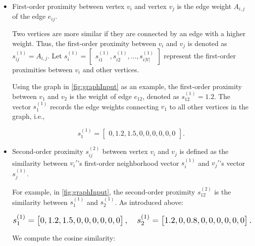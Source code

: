 \begin{itemize}
	\item
	\begin{definition}\label{def:firstOrderProximity}
		First-order proximity between vertex \(v_i\) and vertex \(v_j\) is the edge weight \(A_{i, j}\) of the edge \(e_{ij}\).
	\end{definition}
	
	Two vertices are more similar if they are connected by an edge with a higher weight. Thus, the first-order proximity between \(v_i\) and \(v_j\) is denoted as \(s^{(1)}_{ij} = A_{i, j}\). Let \(s^{(1)}_i = \begin{bmatrix} s^{(1)}_{i1}, s^{(1)}_{i2}, \dots, s^{(1)}_{i|V|} \end{bmatrix}\) represent the first-order proximities between \(v_i\) and other vertices.
	
	Using the graph in \autoref{fig:graphInput} as an example, the first-order proximity between \(v_1\) and \(v_2\) is the weight of edge \(e_{12}\), denoted as \(s^{(1)}_{12} = 1.2\). The vector \(s^{(1)}_1\) records the edge weights connecting \(v_1\) to all other vertices in the graph, i.e.,
	
	\[
	s^{(1)}_{1} = \begin{bmatrix} 0, 1.2, 1.5, 0, 0, 0, 0, 0, 0 \end{bmatrix}.
	\]
	
	\item
	\begin{definition}\label{def:secondOrderProximity}
		Second-order proximity \(s^{(2)}_{ij}\) between vertex \(v_i\) and \(v_j\) is defined as the similarity between \(v_i'\)'s first-order neighborhood vector \(s^{(1)}_i\) and \(v_j'\)'s vector \(s^{(1)}_j\).
	\end{definition}
	
	For example, in \autoref{fig:graphInput}, the second-order proximity \(s^{(2)}_{12}\) is the similarity between \(s^{(1)}_1\) and \(s^{(1)}_2\). As introduced above:
	
	\[
	\resizebox{\linewidth}{!}{$
	s^{(1)}_1 = \begin{bmatrix} 0, 1.2, 1.5, 0, 0, 0, 0, 0, 0 \end{bmatrix}, \quad s^{(1)}_2 = \begin{bmatrix} 1.2, 0, 0.8, 0, 0, 0, 0 , 0, 0 \end{bmatrix}.
	$}
	\]
	
	We compute the cosine similarity:
	

\end{itemize}
